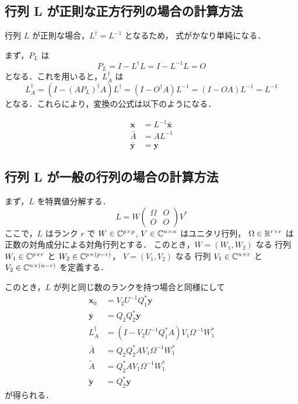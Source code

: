 \subsection{行列 L が正則な正方行列の場合の計算方法}

行列 $L$ が正則な場合，$L^\dagger = L^{-1}$ となるため，
式がかなり単純になる．

まず，$P_L$ は
\begin{equation}
    P_L = I - L^\dagger L = I - L^{-1} L = O
\end{equation}
となる．これを用いると，$L_A^\dagger$ は
\begin{equation}
    L_A^\dagger = \left(I - \left(A P_L\right)^\dagger A\right) L^\dagger
    = \left(I - O^{\dagger} A\right) L^{-1}
    = \left(I - O A\right) L^{-1}
    = L^{-1}
\end{equation}
となる．これらにより，変換の公式は以下のようになる．

\begin{align}
    \bm{x}       & = L^{-1} \bar{\bm{x}} \\
    \bar{A}      & = A L^{-1}            \\
    \bar{\bm{y}} & = \bm{y}
\end{align}

\subsection{行列 L が一般の行列の場合の計算方法}

まず，$L$ を特異値分解する．
\begin{equation}
    L = W
    \begin{pmatrix}
        \Omega & O \\
        O      & O
    \end{pmatrix}
    V^*
\end{equation}
ここで，$L$ はランク $r$ で
$W \in \mathbb{C}^{p \times p}$,
$V \in \mathbb{C}^{n \times n}$
はユニタリ行列，
$\Omega \in \mathbb{R}^{r \times r}$
は正数の対角成分による対角行列とする．
このとき，$W = (W_1, W_2)$ なる
行列 $W_1 \in \mathbb{C}^{p \times r}$ と $W_2 \in \mathbb{C}^{p \times (p-r)}$，
$V = (V_1, V_2)$ なる
行列 $V_1 \in \mathbb{C}^{n \times r}$ と $V_2 \in \mathbb{C}^{n \times (n-r)}$
を定義する．

このとき，$L$ が列と同じ数のランクを持つ場合と同様にして
\begin{align}
    \bm{x}_0       & = V_2 U^{-1} Q_1^* \bm{y}                        \\
    \bar{\bm{y}}   & = Q_2 Q_2^* \bm{y}                               \\
    L_A^\dagger    & = (I - V_2 U^{-1} Q_1^* A) V_1 \Omega^{-1} W_1^* \\
    \bar{A}        & = Q_2 Q_2^* A V_1 \Omega^{-1} W_1^*              \\
    \tilde{A}      & = Q_2^* A V_1 \Omega^{-1} W_1^*                  \\
    \tilde{\bm{y}} & = Q_2^* \bm{y}
\end{align}
が得られる．
